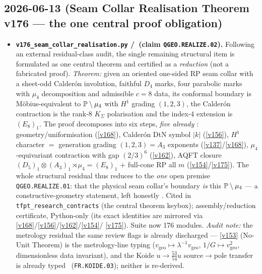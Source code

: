 \subsection*{2026-06-13 (Seam Collar Realisation Theorem v176 --- the one central proof obligation)}
\begin{itemize}
\item \textbf{\texttt{v176\_seam\_collar\_realisation.py} \mE/\mO\ (claim \texttt{QGEO.REALIZE.02}).}
  Following an external residual-class audit, the single remaining structural item is formulated as
  one central theorem and certified as a \emph{reduction} (not a fabricated proof). \emph{Theorem:}
  given an oriented one-sided RP seam collar with a sheet-odd Calder\'on involution, faithful $D_4$
  marks, four parabolic marks with $\mu_4$ decomposition and admissible $c{=}8$ data, its conformal
  boundary is M\"obius-equivalent to $\mathbb{P}\setminus\mu_4$ with $H^1$ grading $(1,2,3)$, the Calder\'on
  contraction is the rank-$8$ $K_\Sigma$ polarisation and the index-$4$ extension is $(E_8)_1$. The
  proof decomposes into six steps, \emph{five already} \mE: geometry/uniformisation (\vref{v168}),
  Calder\'on DtN symbol $|k|$ (\vref{v156}), $H^1$ character $=$ generation grading
  $(1,2,3)=A_3$ exponents (\vref{v137}/\vref{v168}), $\mu_4$-equivariant contraction with gap
  $(2/3)^6$ (\vref{v162}), AQFT closure $(D_5)_1{\otimes}(A_3)_1{\rtimes}\mu_4=(E_8)_1$ $+$ full-cone
  RP all $m$ (\vref{v154}/\vref{v175}). The whole structural residual thus reduces to the \emph{one}
  open premise \texttt{QGEO.REALIZE.01}: that the physical seam collar's boundary \emph{is} this
  $\mathbb{P}\setminus\mu_4$ --- a constructive-geometry statement, left honestly \mO. Cited in
  \texttt{tfpt\_research\_contracts} (the central theorem keybox); assembly/reduction certificate,
  Python-only (its exact identities are mirrored via \vref{v168}/\vref{v156}/\vref{v162}/\vref{v154}/%
  \vref{v175}). Suite now 176 modules. \emph{Audit note:} the metrology residual the same review
  flags is already discharged --- \vref{v153} (No-Unit Theorem) is the metrology-line typing
  ($v_{\mathrm{geo}}\mapsto\lambda^{-1}v_{\mathrm{geo}}$, $1/G\mapsto v_{\mathrm{geo}}^2$,
  dimensionless data invariant), and the Koide $u\to\tfrac{53}{54}u$ source$\to$pole transfer is
  already typed \mC\ (\texttt{FR.KOIDE.03}); neither is re-derived.
\end{itemize}

